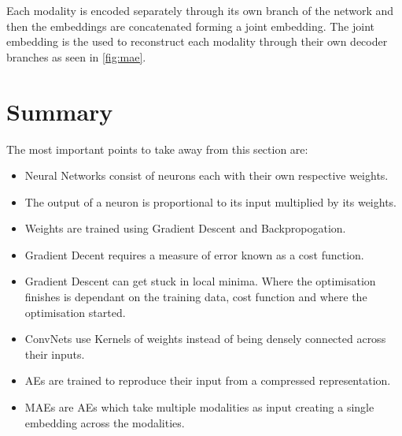 Each modality is encoded separately through its own branch of the network and then the embeddings are concatenated forming a joint embedding. The joint embedding is the used to reconstruct each modality through their own decoder branches as seen in \autoref{fig:mae}.

\section{Summary}

The most important points to take away from this section are:

\begin{itemize}
	\item Neural Networks consist of neurons each with their own respective weights.
	\item The output of a neuron is proportional to its input multiplied by its weights.
	\item Weights are trained using Gradient Descent and Backpropogation.
	\item Gradient Decent requires a measure of error known as a cost function.
	\item Gradient Descent can get stuck in local minima. Where the optimisation finishes is dependant on the training data, cost function and where the optimisation started.
	\item ConvNets use Kernels of weights instead of being densely connected across their inputs.
	\item AEs are trained to reproduce their input from a compressed representation.
	\item MAEs are AEs which take multiple modalities as input creating a single embedding across the modalities.
\end{itemize}

\theendnotes
